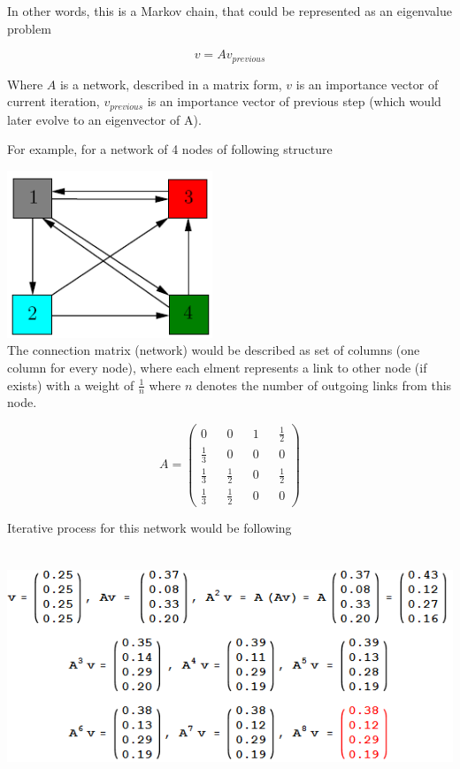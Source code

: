 In other words, this is a Markov chain, that could be represented as an eigenvalue problem

\[
	v = Av_{previous}
\]

Where $A$ is a network, described in a matrix form, $v$ is an importance vector of current iteration, $v_{previous}$ is an importance vector of previous step (which would later evolve to an eigenvector of A).

For example, for a network of 4 nodes of following structure

\includegraphics[height=5cm]{network_1.PNG}\\[1cm]

The connection matrix (network) would be described as set of columns (one column for every node), where each elment represents a link to other node (if exists) with a weight of $\frac{1}{n}$ where $n$ denotes the number of outgoing links from this node.

\[
	A = \left(
		\begin{matrix}
			0 && 0 && 1 && \frac{1}{2} \\
			\frac{1}{3} && 0 && 0 && 0 \\
			\frac{1}{3} && \frac{1}{2} && 0 && \frac{1}{2} \\
			\frac{1}{3} && \frac{1}{2} && 0 && 0
		\end{matrix}
	\right)
\]

Iterative process for this network would be following
\newline 

\includegraphics[height=7cm]{eigenvector_computation.png}\\[1cm]
\newline


